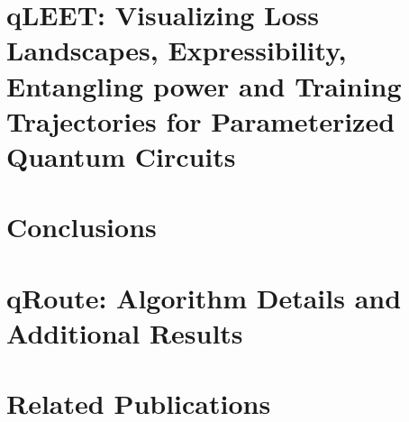 \documentclass[11pt]{book}
\begin{document}

\chapter{qLEET: Visualizing Loss Landscapes, Expressibility, Entangling power and Training Trajectories for Parameterized Quantum Circuits}
\label{ch:qleet}



\chapter{Conclusions}
\label{ch:conc}



\appendix
\chapter{qRoute: Algorithm Details and Additional Results}
\label{ch:appendix-qroute}


\chapter*{Related Publications}
\label{ch:relatedPubs}




 
\end{document}
